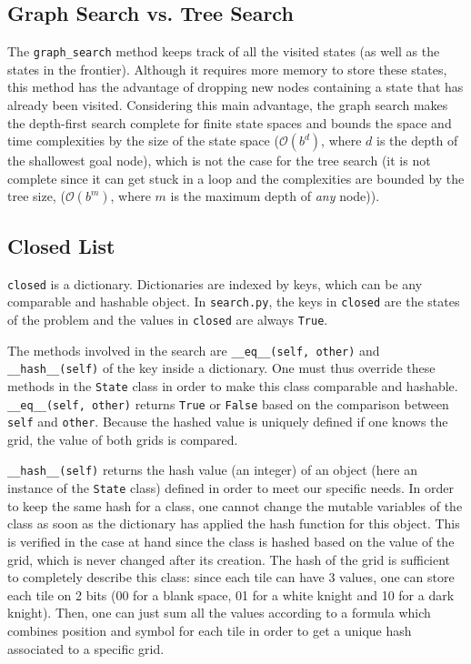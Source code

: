 \documentclass[journal]{IEEEtran}
\newcommand{\py}[1]{\texttt{#1}}
\begin{document}
 \subsection{Graph Search vs. Tree Search}
 The \py{graph_search} method keeps track of all the visited states (as well as the states in the frontier).
 Although it requires more memory to store these states, this method has the advantage of dropping new nodes containing a state that has already been visited.
 Considering this main advantage, the graph search makes the depth-first search complete for finite state spaces and bounds the space and time complexities by the size of the state space (\(\mathcal{O}(b^d)\), where \(d\) is the depth of the shallowest goal node), which is not the case for the tree search (it is not complete since it can get stuck in a loop and the complexities are bounded by the tree size, (\(\mathcal{O}(b^m)\), where \(m\) is the maximum depth of \emph{any} node)).
 \subsection{Closed List}
 \py{closed} is a dictionary.
 Dictionaries are indexed by keys, which can be any comparable and hashable object.
 In \py{search.py}, the keys in \py{closed} are the states of the problem and the values in \py{closed} are always \py{True}.
 
 The methods involved in the search are \py{__eq__(self, other)} and \py{__hash__(self)} of the key inside a dictionary.
 One must thus override these methods in the \py{State} class in order to make this class comparable and hashable.
 \py{__eq__(self, other)} returns \py{True} or \py{False} based on the comparison between \py{self} and \py{other}.
 Because the hashed value is uniquely defined if one knows the grid, the value of both grids is compared. 
 
 \py{__hash__(self)} returns the hash value (an integer) of an object (here an instance of the \py{State} class) defined in order to meet our specific needs.
 In order to keep the same hash for a class, one cannot change the mutable variables of the class as soon as the dictionary has applied the hash function for this object.
 This is verified in the case at hand since the class is hashed based on the value of the grid, which is never changed after its creation.
 The hash of the grid is sufficient to completely describe this class: since each tile can have 3 values, one can store each tile on 2 bits (00 for a blank space, 01 for a white knight and 10 for a dark knight).
 Then, one can just sum all the values according to a formula which combines position and symbol for each tile in order to get a unique hash associated to a specific grid.
\end{document}
